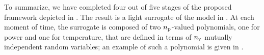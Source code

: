 To summarize, we have completed four out of five stages of the proposed framework depicted in .
The result is a light surrogate of the model in .
At each moment of time, the surrogate is composed of two ${n_\text{p}}$-valued polynomials, one for power and one for temperature, that are defined in terms of ${n_\text{v}}$ mutually independent random variables; an example of such a polynomial is given in .
